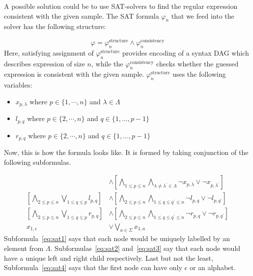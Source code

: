 A possible solution could be to use SAT-solvers to find the regular expression consistent with the given sample. The SAT formula $\varphi_n$ that we feed into the solver has the following structure:

$$\varphi=\varphi^{\text{structure}}_n \wedge  \varphi^{\text{consistency}}_n$$ 
Here, satisfying assignment of $\varphi^{\text{structure}}_n$ provides encoding of a syntax DAG which describes expression of size $n$, while the $\varphi^{\text{consistency}}_n$ checks whether the guessed expression is consistent with the given sample. $\varphi^{\text{structure}}_n$ uses the following variables:

\begin{itemize}[label=$-$]
\item$x_{p,\lambda}$ where $p\in \{1,\cdots, n\}$ and $\lambda\in\Lambda$
\item$l_{p,q}$ where $p\in \{2,\cdots,n\}$ and $q\in\{1,...,p−1\}$
\item$r_{p,q}$ where $p\in \{2,\cdots,n\}$ and $q\in\{1,...,p−1\}$
\end{itemize}
Now, this is how the formula looks like. It is formed by taking conjunction of the following subformulas.

\begin{align}
    [\bigwedge\limits_{1\leq p\leq n} \bigvee\limits_{\lambda \in \Lambda}x_{p,\lambda}]&\wedge[\bigwedge\limits_{1\leq p\leq n}\bigwedge\limits_{\lambda\neq\lambda^{\prime}\in\Lambda}\neg x_{p,\lambda}\vee \neg x_{p,\lambda^{\prime}}]\label{eq:sat1}\\
    [\bigwedge\limits_{2\leq p\leq n} \bigvee\limits_{1\leq q\leq p}l_{p,q}]&\wedge[\bigwedge\limits_{2\leq p\leq n}\bigwedge\limits_{1\leq q\leq q^{\prime}\leq n}\neg l_{p,q}\vee \neg l_{p,q^{\prime}}]\label{eq:sat2}\\
        [\bigwedge\limits_{2\leq p\leq n} \bigvee\limits_{1\leq q\leq p}r_{p,q}]&\wedge[\bigwedge\limits_{2\leq p\leq n}\bigwedge\limits_{1\leq q\leq q^{\prime}\leq n}\neg r_{p,q}\vee \neg r_{p,q^{\prime}}]\label{eq:sat3}\\
    x_{1,\epsilon}&\vee \bigvee\limits_{a\in\Sigma} x_{1, a}\label{eq:sat4}
\end{align}
Subformula~\eqref{eq:sat1} says that each node would be uniquely labelled by an element from $\Lambda$. Subformulas~\eqref{eq:sat2} and~\eqref{eq:sat3} say that each node would have a unique left and right child respectively. Last but not the least, Subformula~\eqref{eq:sat4} says that the first node can have only $\epsilon$ or an alphabet.

